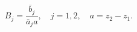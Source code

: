 \begin{equation}
B_{j}=\frac{\bar{b}_{j}}{\bar{a}_{j}a},\quad j=1,2,\quad
a=z_{2}-z_{1}. \label{Bjcoef}
\end{equation}

